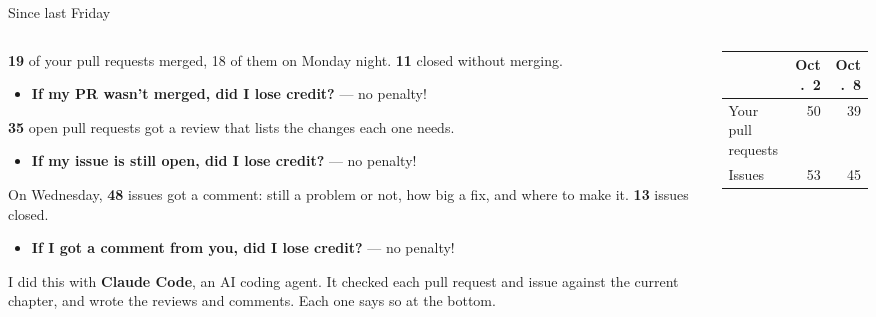 \documentclass[9pt,aspectratio=169]{beamer}
\begin{document}
\begin{frame}{Since last Friday}
    \begin{columns}
        \begin{column}{0.6\textwidth}\small 
            \textbf{19} of your pull requests merged, 18 of them on Monday night. \textbf{11} closed without merging.
            \begin{itemize}
                \item \textbf{If my PR wasn't merged, did I lose credit?} --- no penalty!
            \end{itemize}

            \medskip

            \textbf{35} open pull requests got a review that lists the changes each one needs.
            \begin{itemize}
                \item \textbf{If my issue is still open, did I lose credit?} --- no penalty!
            \end{itemize}

            \medskip

            On Wednesday, \textbf{48} issues got a comment: still a problem or not, how big a fix, and where to make it. \textbf{13} issues closed.
            \begin{itemize}
                \item \textbf{If I got a comment from you, did I lose credit?} --- no penalty!
            \end{itemize}

            \medskip

            I did this with \textbf{Claude Code}, an AI coding agent. It checked each pull request and issue against the current chapter, and wrote the reviews and comments. Each one says so at the bottom.
        \end{column}
        \begin{column}{0.35\textwidth}
                \small
                \begin{tabular}{@{}lrr@{}}
                     & Oct.~2 & Oct.~8 \\
                    \midrule
                    Your pull requests & 50 & 39 \\
                    Issues & 53 & 45 \\
                \end{tabular}
        \end{column}
    \end{columns}
\end{frame}
\end{document}
